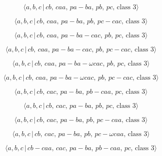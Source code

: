 \documentclass[10pt]{article}
\begin{document}
\begin{equation}
\langle a,b,c\,|\,cb,\,caa,\,pa-ba,\,pb,\,pc,\,\text{class }3\rangle 
\tag{6.267}
\end{equation}

\begin{equation}
\langle a,b,c\,|\,cb,\,caa,\,pa-ba,\,pb,\,pc-cac,\,\text{class }3\rangle 
\tag{6.268}
\end{equation}

\begin{equation}
\langle a,b,c\,|\,cb,\,caa,\,pa-ba-cac,\,pb,\,pc,\,\text{class }3\rangle 
\tag{6.269}
\end{equation}

\begin{equation}
\langle a,b,c\,|\,cb,\,caa,\,pa-ba-cac,\,pb,\,pc-cac,\,\text{class }3\rangle
\tag{6.270}
\end{equation}

\begin{equation}
\langle a,b,c\,|\,cb,\,caa,\,pa-ba-\omega cac,\,pb,\,pc,\,\text{class }%
3\rangle  \tag{6.271}
\end{equation}

\begin{equation}
\langle a,b,c\,|\,cb,\,caa,\,pa-ba-\omega cac,\,pb,\,pc-cac,\,\text{class }%
3\rangle  \tag{6.272}
\end{equation}

\begin{equation}
\langle a,b,c\,|\,cb,\,cac,\,pa-ba,\,pb-caa,\,pc,\,\text{class }3\rangle 
\tag{6.273}
\end{equation}

\begin{equation}
\langle a,b,c\,|\,cb,\,cac,\,pa-ba,\,pb,\,pc,\,\text{class }3\rangle 
\tag{6.274}
\end{equation}

\begin{equation}
\langle a,b,c\,|\,cb,\,cac,\,pa-ba,\,pb,\,pc-caa,\,\text{class }3\rangle 
\tag{6.275}
\end{equation}

\begin{equation}
\langle a,b,c\,|\,cb,\,cac,\,pa-ba,\,pb,\,pc-\omega caa,\,\text{class }%
3\rangle  \tag{6.276}
\end{equation}

\begin{equation}
\langle a,b,c\,|\,cb-caa,\,cac,\,pa-ba,\,pb-caa,\,pc,\,\text{class }3\rangle
\tag{6.277}
\end{equation}
\end{document}
